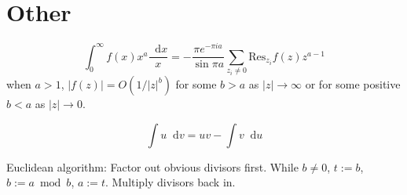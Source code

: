 \documentclass[10pt]{article}
\newcommand\dif{\mathop{}\!\mathrm{d}}
\newcommand{\Res}{\mathrm{Res}}
\begin{document}
\section{Other}
$$
  \int_0^\infty f(x) x^a \frac{\dif x}{x}
= -\frac{\pi e^{-\pi i a}}{\sin \pi a}
  \sum_{z_i \neq 0} \Res_{z_i} f(z) z^{a-1}
$$
when $a > 1$, $|f(z)| = O(1 / |z|^b)$ for some $b > a$ as $|z| \to \infty$
or for some positive $b < a$ as $|z| \to 0$.

$$
\int u \dif v = uv - \int v \dif u
$$

Euclidean algorithm: Factor out obvious divisors first.
While $b \neq 0$, $t := b$, $b := a \bmod b$, $a := t$.
Multiply divisors back in.
\end{document}

